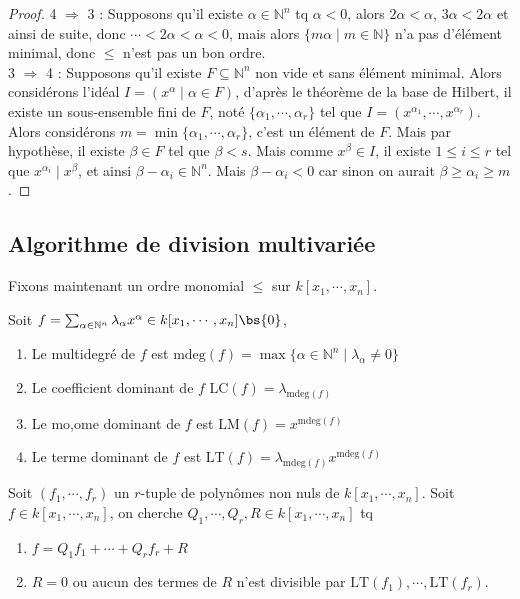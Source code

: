             \begin{proof}
                4 $\Rightarrow$ 3 : Supposons qu'il existe $\alpha \in \mathbb{N}^n$ tq $\alpha < 0$, alors $2\alpha < \alpha$, $3\alpha < 2\alpha$ et ainsi de suite, donc $\cdots < 2\alpha < \alpha < 0$, mais alors $\{m\alpha \mid m \in \mathbb{N}\}$ n'a pas d'élément minimal, donc $\leq$ n'est pas un bon ordre. \\
                3 $\Rightarrow$ 4 : Supposons qu'il existe $F \subseteq \mathbb{N}^n$ non vide et sans élément minimal. Alors considérons l'idéal $I = (x^\alpha \mid \alpha \in F)$, d'après le théorème de la base de Hilbert, il existe un sous-ensemble fini de $F$, noté $\{\alpha_1, \cdots, \alpha_r\}$ tel que $I = (x^{\alpha_1}, \cdots, x^{\alpha_r})$. Alors considérons $m = \min \{\alpha_1, \cdots, \alpha_r\}$, c'est un élément de $F$. Mais par hypothèse, il existe $\beta \in F$ tel que $\beta < s$. Mais comme $x^\beta \in I$, il existe $1 \leq i \leq r$ tel que $x^{\alpha_i} \mid x^\beta$, et ainsi $\beta - \alpha_i \in \mathbb{N}^n$. Mais $\beta - \alpha_i < 0$ car sinon on aurait $\beta \geq \alpha_i \geq m$. 
            \end{proof}

        \subsection{Algorithme de division multivariée}
            Fixons maintenant un ordre monomial $\leq$ sur $k[x_1, \cdots, x_n]$.
            \begin{defi}
                Soit $f = \sum_{\alpha \in \mathbb{N}^n} \lambda_\alpha x^\alpha \in k[x_1, \cdots, x_n] \bs \{0\}$, 
                \begin{enumerate}
                    \item Le multidegré de $f$ est $\mathrm{mdeg}(f) = \max \{\alpha \in \mathbb{N}^n \mid \lambda_\alpha \neq 0\}$
                    \item Le coefficient dominant de $f$ $\mathrm{LC}(f) = \lambda_{\mathrm{mdeg}(f)}$
                    \item Le mo,ome dominant de $f$ est $\mathrm{LM}(f) = x^{\mathrm{mdeg}(f)}$
                    \item Le terme dominant de $f$ est $\mathrm{LT}(f) = \lambda_{\mathrm{mdeg}(f)}x^{\mathrm{mdeg}(f)}$
                \end{enumerate}
            \end{defi}
            Soit $(f_1, \cdots, f_r)$ un $r$-tuple de polynômes non nuls de $k[x_1, \cdots, x_n]$. Soit $f \in k[x_1, \cdots, x_n]$, on cherche $Q_1, \cdots, Q_r, R \in k[x_1, \cdots, x_n]$ tq
            \begin{enumerate}
                \item $f = Q_1f_1 + \cdots + Q_r f_r + R$
                \item $R = 0$ ou aucun des termes de $R$ n'est divisible par $\mathrm{LT}(f_1), \cdots, \mathrm{LT}(f_r)$.
            \end{enumerate}
            
